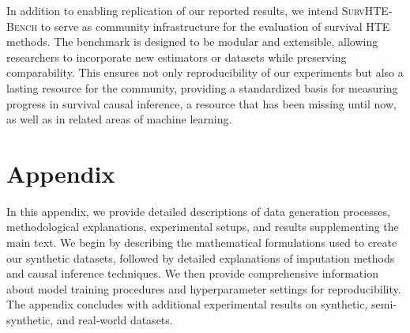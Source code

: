 \documentclass{article} %
\begin{document}
In addition to enabling replication of our reported results, we intend \textsc{SurvHTE‐Bench} to serve as
community infrastructure for the evaluation of survival HTE methods. The benchmark is designed
to be modular and extensible, allowing researchers to incorporate new estimators or datasets while
preserving comparability. This ensures not only reproducibility of our experiments but also a lasting
resource for the community, providing a standardized basis for measuring progress in survival causal inference, a resource that has been missing until now, as well as in related areas of machine learning.







% 




\newpage





\clearpage
\appendix
\section*{\textbf{Appendix}}
\vspace{-1.em}
In this appendix, we provide detailed descriptions of data generation processes, methodological explanations, experimental setups, and results supplementing the main text. We begin by describing the mathematical formulations used to create our synthetic datasets, followed by detailed explanations of imputation methods and causal inference techniques. We then provide comprehensive information about model training procedures and hyperparameter settings for reproducibility. The appendix concludes with additional experimental results on synthetic, semi-synthetic, and real-world datasets.
\end{document}
